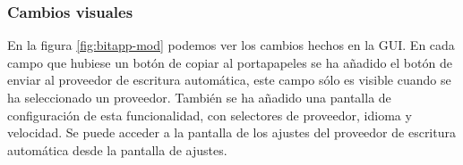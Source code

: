 \subsubsection{Cambios visuales}
En la figura \ref{fig:bitapp-mod} podemos ver los cambios hechos en la GUI. En cada campo que hubiese un botón de copiar al portapapeles se ha añadido el botón de enviar al proveedor de escritura automática, este campo sólo es visible cuando se ha seleccionado un proveedor. También se ha añadido una pantalla de configuración de esta funcionalidad, con selectores de proveedor, idioma y velocidad. Se puede acceder a la pantalla de los ajustes del proveedor de escritura automática desde la pantalla de ajustes.
\begin{figure}[H]
    \centering

\end{figure}

